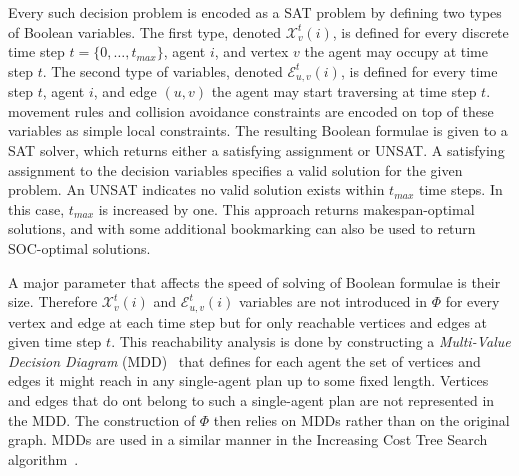 Every such decision problem is encoded as a SAT problem by defining two types of Boolean variables. The first type, denoted
$\mathcal{X}_{v}^{t}(i)$, is defined 
for every discrete time step $t=\{0,\ldots, t_{max}\}$, 
agent $i$, 
and vertex $v$ the agent may occupy at time step $t$. 
The second type of variables, denoted $\mathcal{E}_{u,v}^{t}(i)$, is defined 
for every time step $t$, agent $i$, 
and edge $(u,v)$ the agent may start traversing at time step $t$. 
\mapf movement rules and collision avoidance constraints are encoded on top of these variables as simple local constraints. 
The resulting Boolean formulae is given to a SAT solver, which returns either a satisfying assignment or UNSAT. A satisfying assignment to the decision variables specifies a valid solution for the given \mapf problem. An UNSAT indicates no valid solution exists within $t_{max}$ time steps. In this case, $t_{max}$ is increased by one. 
This approach returns makespan-optimal solutions, and with some additional bookmarking can also be used to return SOC-optimal solutions. 

A major parameter that affects the speed of solving of Boolean formulae is their size. Therefore $\mathcal{X}_{v}^{t}(i)$ and $\mathcal{E}_{u,v}^{t}(i)$ variables are not introduced in $\Phi$ for every vertex and edge at each time step but for only reachable vertices and edges at given time step $t$. This reachability analysis is done by constructing a 
{\em Multi-Value Decision Diagram}  (MDD)~\cite{srinivasan1990algorithms} 
that defines for each agent the set of vertices and edges it might reach in any single-agent plan up to some fixed length. Vertices and edges that do ont belong to such a single-agent plan are not represented in the MDD. The construction of $\Phi$ then relies on MDDs rather than on the original graph. MDDs are used in a similar manner in the Increasing Cost Tree Search \mapf algorithm~\cite{sharon2013increasing}.


